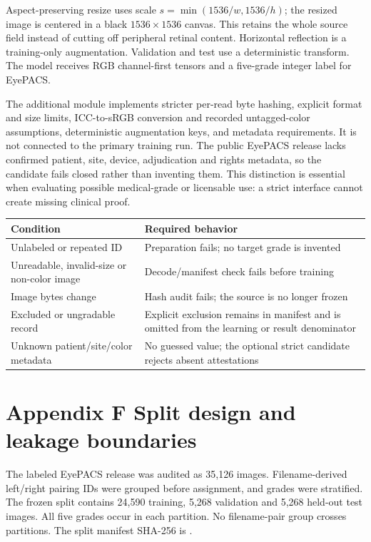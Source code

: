 Aspect-preserving resize uses scale
$s=\min(1536/w,1536/h)$; the resized image is centered in a black
$1536\times1536$ canvas. This retains the whole source field instead of
cutting off peripheral retinal content. Horizontal reflection is a
training-only augmentation. Validation and test use a deterministic
transform. The model receives RGB channel-first tensors and a five-grade
integer label for EyePACS.

The additional module implements stricter per-read byte hashing, explicit
format and size limits, ICC-to-sRGB conversion and recorded untagged-color
assumptions, deterministic augmentation keys, and metadata requirements.
It is not connected to the primary training run. The public EyePACS
release lacks confirmed patient, site, device, adjudication and rights
metadata, so the candidate fails closed rather than inventing them.
This distinction is essential when evaluating possible medical-grade or
licensable use: a strict interface cannot create missing clinical proof.

\small
\begin{tabularx}{\linewidth}{@{}p{.33\linewidth}Y@{}}
\toprule
Condition & Required behavior\\
\midrule
Unlabeled or repeated ID & Preparation fails; no target grade is invented\\
Unreadable, invalid-size or non-color image & Decode/manifest check
fails before training\\
Image bytes change & Hash audit fails; the source is no longer frozen\\
Excluded or ungradable record & Explicit exclusion remains in manifest
and is omitted from the learning or result denominator\\
Unknown patient/site/color metadata & No guessed value; the optional
strict candidate rejects absent attestations\\
\bottomrule
\end{tabularx}
\normalsize

\newpage
\section*{\color{ink}Appendix F \quad Split design and leakage boundaries}
The labeled EyePACS release was audited as 35,126 images. Filename-derived
left/right pairing IDs were grouped before assignment, and grades were
stratified. The frozen split contains 24,590 training, 5,268 validation
and 5,268 held-out test images. All five grades occur in each partition.
No filename-pair group crosses partitions. The split manifest SHA-256 is
{\scriptsize{}}.


